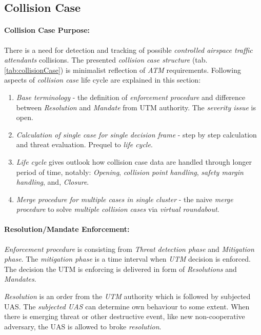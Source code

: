 \subsection{Collision Case}\label{sec:collisionCase}


\paragraph{Collision Case Purpose:} There is a need for detection and tracking of possible \emph{controlled airspace traffic attendants} collisions.  The presented \emph{collision case structure} (tab. \ref{tab:collisionCase}) is minimalist reflection of \emph{ATM} requirements. Following aspects of  \emph{collision case} life cycle are explained in this section:
\begin{enumerate}
    \item \emph{Base terminology} - the definition of \emph{enforcement procedure} and difference between \emph{Resolution} and \emph{Mandate} from UTM authority. The \emph{severity issue} is open.
    
    \item \emph{Calculation of single case for single decision frame} - step by step calculation and threat evaluation. Prequel to \emph{life cycle}.
    
    \item \emph{Life cycle} gives outlook how collision case data are handled through longer period of time, notably: \emph{Opening}, \emph{collision point handling}, \emph{safety margin handling}, and, \emph{Closure}.
    
    \item \emph{Merge procedure for multiple cases in single cluster} - the naive \emph{merge procedure} to solve \emph{multiple collision cases} via \emph{virtual roundabout}.
\end{enumerate}


\paragraph{Resolution/Mandate Enforcement:}
\emph{Enforcement procedure} is consisting from \emph{Threat detection phase} and \emph{Mitigation phase}. The \emph{mitigation phase} is a time interval when \emph{UTM} decision is enforced. The decision the UTM is enforcing is delivered in form of \emph{Resolutions} and \emph{Mandates}.


\emph{Resolution} is an order from the \emph{UTM} authority which is followed by subjected UAS. The \emph{subjected UAS} can determine own behaviour to some extent. When there is emerging threat or other destructive event, like new non-cooperative adversary, the UAS is allowed to broke \emph{resolution}.  

